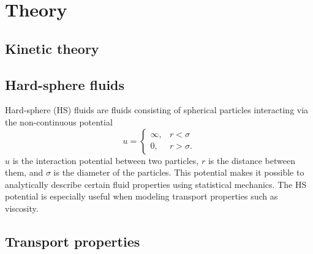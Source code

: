 \chapter{Theory}
\label{sec:theory}

\section{Kinetic theory}

\section{Hard-sphere fluids}
Hard-sphere (HS) fluids are fluids consisting of spherical particles 
interacting via the non-continuous potential 
\begin{equation}
    \label{eq:hard_sphere_potential}
    u = 
    \begin{cases}
        \infty, & r < \sigma \\
        0, & r > \sigma.
    \end{cases}
\end{equation}
$u$ is the interaction potential between two particles, 
$r$ is the distance between them, 
and $\sigma$ is the diameter of the particles.
This potential makes it possible to analytically describe 
certain fluid properties using statistical mechanics. 
The HS potential is especially useful when modeling 
transport properties such as viscosity.


\section{Transport properties}


